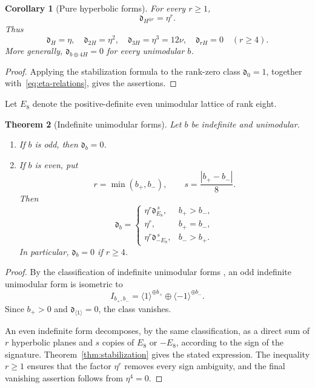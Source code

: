 \documentclass[11pt,a4paper]{amsart}
\newcommand{\dclass}{\mathfrak d}
\theoremstyle{plain}
\newtheorem{theorem}{Theorem}[section]
\newtheorem{corollary}[theorem]{Corollary}
\theoremstyle{definition}
\theoremstyle{remark}
\begin{document}
\begin{corollary}[Pure hyperbolic forms]\label{cor:pure-hyperbolic}
For every $r\ge1$,
\[
 \dclass_{H^{\oplus r}}=\eta^r.
\]
Thus
\[
 \dclass_H=\eta,
 \quad
 \dclass_{2H}=\eta^2,
 \quad
 \dclass_{3H}=\eta^3=12\nu,
 \quad
 \dclass_{rH}=0\quad(r\ge4).
\]
More generally, $\dclass_{b\oplus4H}=0$ for every unimodular $b$.
\end{corollary}

\begin{proof}
Applying the stabilization formula to the rank-zero class
$\dclass_0=1$, together with~\eqref{eq:eta-relations}, gives the
assertions.
\end{proof}

Let $E_8$ denote the positive-definite even unimodular lattice of
rank eight.

\begin{theorem}[Indefinite unimodular forms]\label{thm:indefinite}
Let $b$ be indefinite and unimodular.
\begin{enumerate}[label=\textup{(\roman*)},leftmargin=2.5em]
\item If $b$ is odd, then $\dclass_b=0$.
\item If $b$ is even, put
\[
 r=\min(b_+,b_-),
 \qquad
 s=\frac{|b_+-b_-|}{8}.
\]
Then
\[
 \dclass_b=
 \begin{cases}
  \eta^r\dclass_{E_8}^{\,s},&b_+>b_-,\\
  \eta^r,&b_+=b_-,\\
  \eta^r\dclass_{-E_8}^{\,s},&b_->b_+.
 \end{cases}
\]
In particular, $\dclass_b=0$ if $r\ge4$.
\end{enumerate}
\end{theorem}

\begin{proof}
By the classification of indefinite unimodular forms
\cite[Chapter~II]{MH}, an odd indefinite unimodular form is
isometric to
\[
 I_{b_+,b_-}=\langle1\rangle^{\oplus b_+}\oplus\langle-1\rangle^{\oplus b_-}.
\]
Since $b_+>0$ and $\dclass_{\langle1\rangle}=0$, the class vanishes.

An even indefinite form decomposes, by the same classification, as a
direct sum of $r$ hyperbolic planes and $s$ copies of $E_8$ or $-E_8$,
according to the sign of the signature. Theorem~\ref{thm:stabilization}
gives the stated expression. The inequality $r\ge1$ ensures that the
factor $\eta^r$ removes every sign ambiguity, and the final vanishing
assertion follows from $\eta^4=0$.
\end{proof}
\end{document}
